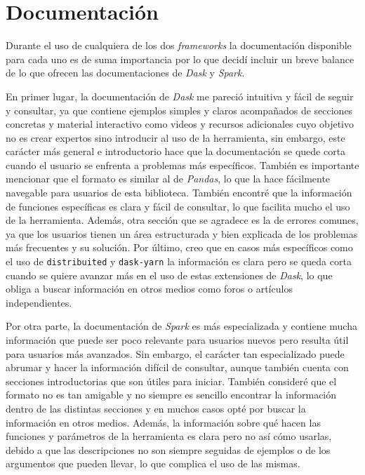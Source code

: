 \section{Documentación}

Durante el uso de cualquiera de los dos \textit{frameworks} la documentación disponible para cada uno es de suma importancia por lo que decidí incluir un breve balance de lo que ofrecen las documentaciones de \textit{Dask} y \textit{Spark}.

En primer lugar, la documentación de \textit{Dask} me pareció intuitiva y fácil de seguir y consultar, ya que contiene ejemplos simples y claros acompañados de secciones concretas y material interactivo como videos y recursos adicionales cuyo objetivo no es crear expertos sino introducir al uso de la herramienta, sin embargo, este carácter más general e introductorio hace que la documentación se quede corta cuando el usuario se enfrenta a problemas más específicos. También es importante mencionar que el formato es similar al de \textit{Pandas}, lo que la hace fácilmente navegable para usuarios de esta biblioteca. También encontré que la información de funciones específicas es clara y fácil de consultar, lo que facilita mucho el uso de la herramienta. Además, otra sección que se agradece es la de errores comunes, ya que los usuarios tienen un área estructurada y bien explicada de los problemas más frecuentes y su solución. Por último, creo que en casos más específicos como el uso de \texttt{distribuited} y \texttt{dask-yarn} la información es clara pero se queda corta cuando se quiere avanzar más en el uso de estas extensiones de \textit{Dask}, lo que obliga a buscar información en otros medios como foros o artículos independientes.

Por otra parte, la documentación de \textit{Spark} es más especializada y contiene mucha información que puede ser poco relevante para usuarios nuevos pero resulta útil para usuarios más avanzados. Sin embargo, el carácter tan especializado puede abrumar y hacer la información difícil de consultar, aunque también cuenta con secciones introductorias que son útiles para iniciar. También consideré que el formato no es tan amigable y no siempre es sencillo encontrar la información dentro de las distintas secciones y en muchos casos opté por buscar la información en otros medios. Además, la información sobre qué hacen las funciones y parámetros de la herramienta es clara pero no así cómo usarlas, debido a que las descripciones no son siempre seguidas de ejemplos o de los argumentos que pueden llevar, lo que complica el uso de las mismas.

